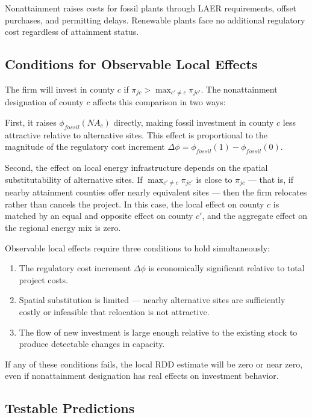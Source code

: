 \documentclass[12pt]{article}
\begin{document}
Nonattainment raises costs for fossil plants through LAER requirements, offset purchases, and permitting delays. Renewable plants face no additional regulatory cost regardless of attainment status.

\subsection{Conditions for Observable Local Effects}

The firm will invest in county $c$ if $\pi_{jc} > \max_{c' \neq c} \pi_{jc'}$. The nonattainment designation of county $c$ affects this comparison in two ways:

First, it raises $\phi_{fossil}(NA_c)$ directly, making fossil investment in county $c$ less attractive relative to alternative sites. This effect is proportional to the magnitude of the regulatory cost increment $\Delta\phi = \phi_{fossil}(1) - \phi_{fossil}(0)$.

Second, the effect on local energy infrastructure depends on the spatial substitutability of alternative sites. If $\max_{c' \neq c} \pi_{jc'}$ is close to $\pi_{jc}$ --- that is, if nearby attainment counties offer nearly equivalent sites --- then the firm relocates rather than cancels the project. In this case, the local effect on county $c$ is matched by an equal and opposite effect on county $c'$, and the aggregate effect on the regional energy mix is zero.

Observable local effects require three conditions to hold simultaneously:
\begin{enumerate}
    \item The regulatory cost increment $\Delta\phi$ is economically significant relative to total project costs.
    \item Spatial substitution is limited --- nearby alternative sites are sufficiently costly or infeasible that relocation is not attractive.
    \item The flow of new investment is large enough relative to the existing stock to produce detectable changes in capacity.
\end{enumerate}

If any of these conditions fails, the local RDD estimate will be zero or near zero, even if nonattainment designation has real effects on investment behavior.

\subsection{Testable Predictions}
\end{document}
